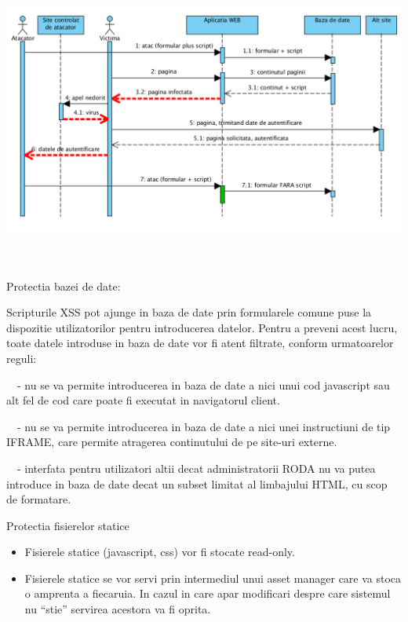  \includegraphics[width=6.7602in,height=3.8437in]{SecuritateaarhiveiRODA-img004.png} 

Protectia bazei de date:

{\sffamily\color{black}
Scripturile XSS pot ajunge in baza de date prin formularele comune puse la dispozitie utilizatorilor pentru introducerea
datelor. Pentru a preveni acest lucru, toate datele introduse in baza de date vor fi atent filtrate, conform
urmatoarelor reguli:}

{\sffamily\color{black}
\ \ {}- nu se va permite introducerea in baza de date a nici unui cod javascript sau alt fel de cod care poate fi
executat in navigatorul client. }

{\sffamily\color{black}
\ \ {}- nu se va permite introducerea in baza de date a nici unei instructiuni de tip IFRAME, care permite atragerea
continutului de pe site-uri externe. }

{\sffamily\color{black}
\ \ {}- interfata pentru utilizatori altii decat administratorii RODA nu va putea introduce in baza de date decat un
subset limitat al limbajului HTML, cu scop de formatare. }

{\sffamily\color{black}
Protectia fisierelor statice}
\begin{itemize}
  \item 
  Fisierele statice (javascript, css) vor fi stocate read-only.
  \item 
  Fisierele statice se vor servi prin intermediul unui asset manager care va stoca o amprenta a fiecaruia. In cazul in
care apar modificari despre care sistemul nu ``stie'' servirea acestora va fi oprita.
\end{itemize}

